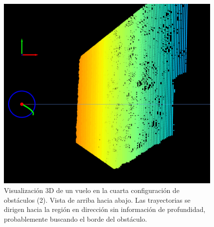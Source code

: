 \begin{figure}[H]
    \centering
    \includegraphics[scale=0.25]{partes/img/depth-wall-2-top.png}
    \caption[Visualización 3D de un vuelo en la cuarta configuración de obstáculos (2). Vista de arriba hacia abajo. Búsqueda del borde del obstáculo.]{Visualización 3D de un vuelo en la cuarta configuración de obstáculos (2). Vista de arriba hacia abajo. Las trayectorias se dirigen hacia la región en dirección  sin información de profundidad, probablemente buscando el borde del obstáculo.}
    \label{depth-wall-2}
\end{figure}

